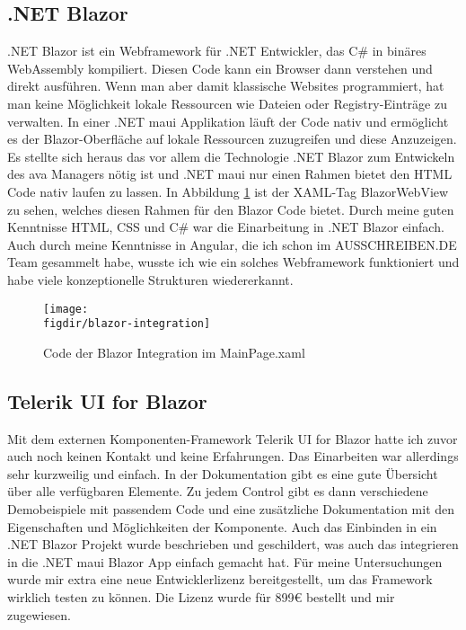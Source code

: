\subsection{.NET Blazor}
.NET Blazor ist ein Webframework für .NET Entwickler, das C\# in binäres WebAssembly kompiliert. Diesen Code kann ein Browser dann verstehen und direkt ausführen. Wenn man aber damit klassische Websites programmiert, hat man keine Möglichkeit lokale Ressourcen wie Dateien oder Registry-Einträge zu verwalten. In einer .NET \ac{maui} Applikation läuft der Code nativ und ermöglicht es der Blazor-Oberfläche auf lokale Ressourcen zuzugreifen und diese Anzuzeigen.
Es stellte sich heraus das vor allem die Technologie .NET Blazor zum Entwickeln des \ac{ava} Managers nötig ist und .NET \ac{maui} nur einen Rahmen bietet den HTML Code nativ laufen zu lassen. In Abbildung \ref{fig:blazor-integration} ist der XAML-Tag BlazorWebView zu sehen, welches diesen Rahmen für den Blazor Code bietet. Durch meine guten Kenntnisse HTML, CSS und C\# war die Einarbeitung in .NET Blazor einfach. Auch durch meine Kenntnisse in Angular, die ich schon im AUSSCHREIBEN.DE Team gesammelt habe, wusste ich wie ein solches Webframework funktioniert und habe viele konzeptionelle Strukturen wiedererkannt.

\begin{figure}[h]
	\centering
	{\caption{Code der Blazor Integration im MainPage.xaml}
		\label{fig:blazor-integration}}
	{\texttt{[image: \\figdir/blazor-integration]}}
\end{figure}

\subsection{Telerik UI for Blazor}
Mit dem externen Komponenten-Framework Telerik UI for Blazor hatte ich zuvor auch noch keinen Kontakt und keine Erfahrungen. Das Einarbeiten war allerdings sehr kurzweilig und einfach. In der Dokumentation gibt es eine gute Übersicht über alle verfügbaren Elemente. Zu jedem Control gibt es dann verschiedene Demobeispiele mit passendem Code und eine zusätzliche Dokumentation mit den Eigenschaften und Möglichkeiten der Komponente. Auch das Einbinden in ein .NET Blazor Projekt wurde beschrieben und geschildert, was auch das integrieren in die .NET \ac{maui} Blazor App einfach gemacht hat.
Für meine Untersuchungen wurde mir extra eine neue Entwicklerlizenz bereitgestellt, um das Framework wirklich testen zu können. Die Lizenz wurde für 899€ bestellt und mir zugewiesen. \cite{Telerik_22}

